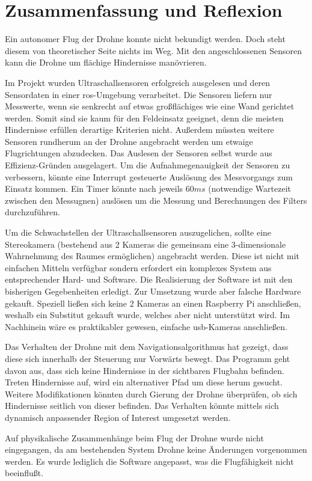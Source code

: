 \chapter{Zusammenfassung und Reflexion}
Ein autonomer Flug der Drohne konnte nicht bekundigt werden. Doch steht diesem von theoretischer Seite nichts im Weg. Mit den angeschlossenen Sensoren kann die Drohne um flächige Hindernisse manövrieren.\newline

Im Projekt wurden Ultraschallsensoren erfolgreich ausgelesen und deren Sensordaten in einer \acrshort{ros}-Umgebung verarbeitet. Die Sensoren liefern nur Messwerte, wenn sie senkrecht auf etwas großflächiges wie eine Wand gerichtet werden. Somit sind sie kaum für den Feldeinsatz geeignet, denn die meisten Hindernisse erfüllen derartige Kriterien nicht. Außerdem müssten weitere Sensoren rundherum an der Drohne angebracht werden um etwaige Flugrichtungen abzudecken. Das Auslesen der Sensoren selbst wurde aus Effizienz-Gründen ausgelagert. Um die Aufnahmegenauigkeit der Sensoren zu verbessern, könnte eine Interrupt gesteuerte Auslösung des Messvorgangs zum Einsatz kommen. Ein Timer könnte nach jeweils $60ms$ (notwendige Wartezeit zwischen den Messugnen) auslösen um die Messung und Berechnungen des Filters durchzuführen.\newline

Um die Schwachstellen der Ultraschallsensoren auszugelichen, sollte eine Stereokamera (bestehend aus 2 Kameras die gemeinsam eine 3-dimensionale Wahrnehmung des Raumes ermöglichen) angebracht werden. Diese ist nicht mit einfachen Mitteln verfügbar sondern erfordert ein komplexes System aus entsprechender Hard- und Software. Die Realisierung der Software ist mit den bisherigen Gegebenheiten erledigt. Zur Umsetzung wurde aber falsche Hardware gekauft. Speziell ließen sich keine 2 Kameras an einen Raspberry Pi anschließen, weshalb ein Substitut gekauft wurde, welches aber nicht unterstützt wird. Im Nachhinein wäre es praktikabler gewesen, einfache \acrshort{usb}-Kameras anschließen.\newline

Das Verhalten der Drohne mit dem Navigationsalgorithmus hat gezeigt, dass diese sich innerhalb der Steuerung nur Vorwärts bewegt. Das Programm geht davon aus, dass sich keine Hindernisse in der sichtbaren Flugbahn befinden. Treten Hindernisse auf, wird ein alternativer Pfad um diese herum gesucht. Weitere Modifikationen könnten durch Gierung der Drohne überprüfen, ob sich Hindernisse seitlich von dieser befinden. Das Verhalten könnte mittels sich dynamisch anpassender Region of Interest umgesetzt werden.\newline

Auf physikalische Zusammenhänge beim Flug der Drohne wurde nicht eingegangen, da am bestehenden System Drohne keine Änderungen vorgenommen werden. Es wurde lediglich die Software angepasst, was die Flugfähigkeit nicht beeinflußt.
